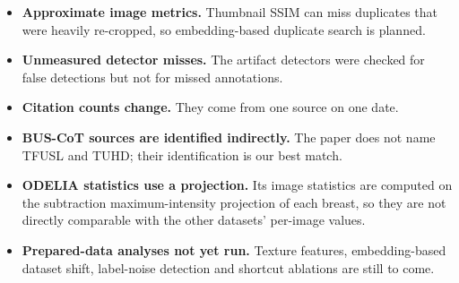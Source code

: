 \documentclass[11pt]{article}
\begin{document}
\begin{itemize}
  \item \textbf{Approximate image metrics.} Thumbnail SSIM can miss duplicates
  that were heavily re-cropped, so embedding-based duplicate search is planned.
  \item \textbf{Unmeasured detector misses.} The artifact detectors were
  checked for false detections but not for missed annotations.
  \item \textbf{Citation counts change.} They come from one source on one date.
  \item \textbf{BUS-CoT sources are identified indirectly.} The paper does not
  name TFUSL and TUHD; their identification is our best match.
  \item \textbf{ODELIA statistics use a projection.} Its image statistics are
  computed on the subtraction maximum-intensity projection of each breast, so
  they are not directly comparable with the other datasets' per-image values.
  \item \textbf{Prepared-data analyses not yet run.} Texture features,
  embedding-based dataset shift, label-noise detection and shortcut ablations
  are still to come.
\end{itemize}



\end{document}
